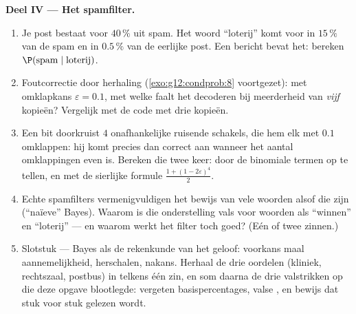 \begin{problem}
\medskip
\noindent\textbf{Deel IV --- Het spamfilter.}
\begin{enumerate}[resume]
  \item Je post bestaat voor $40\,\%$ uit spam. Het woord ``loterij'' komt
        voor in $15\,\%$ van de spam en in $0.5\,\%$ van de eerlijke post. Een
        bericht bevat het: bereken $\P(\text{spam} \mid \text{loterij})$.
  \item Foutcorrectie door herhaling (\cref{exo:g12:condprob:8} voortgezet):
        met omklapkans $\varepsilon = 0.1$, met welke  faalt het decoderen
        bij meerderheid van \emph{vijf} kopieën? Vergelijk met de code met
        drie kopieën.
  \item Een bit doorkruist $4$ onafhankelijke ruisende schakels, die hem elk
        met  $0.1$ omklappen: hij komt precies dan correct aan wanneer het
        aantal omklappingen even is. Bereken die  twee keer: door de
        binomiale termen op te tellen, en met de sierlijke formule
        $\frac{1 + (1 - 2\varepsilon)^4}{2}$.
  \item Echte spamfilters vermenigvuldigen het bewijs van vele woorden alsof
        die  zijn (``naïeve'' Bayes). Waarom is die onderstelling
        vals voor woorden als ``winnen'' en ``loterij'' --- en waarom werkt het
        filter toch goed? (Eén of twee zinnen.)
  \item Slotstuk --- Bayes als de rekenkunde van het geloof: voorkans maal
        aannemelijkheid, herschalen, nakans. Herhaal de drie oordelen
        (kliniek, rechtszaal, postbus) in telkens één zin, en som daarna de
        drie valstrikken op die deze opgave blootlegde: vergeten
        basispercentages, valse , en bewijs dat stuk voor
        stuk gelezen wordt.
\end{enumerate}
\end{problem}
